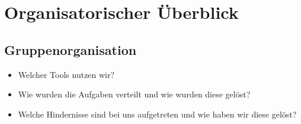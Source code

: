 \section{Organisatorischer Überblick}

\subsection{Gruppenorganisation}

\begin{itemize}
    \item Welcher Tools nutzen wir?
    \item Wie wurden die Aufgaben verteilt und wie wurden diese gelöst?
    \item Welche Hindernisse sind bei uns aufgetreten und wie haben wir diese gelöst?
\end{itemize}

